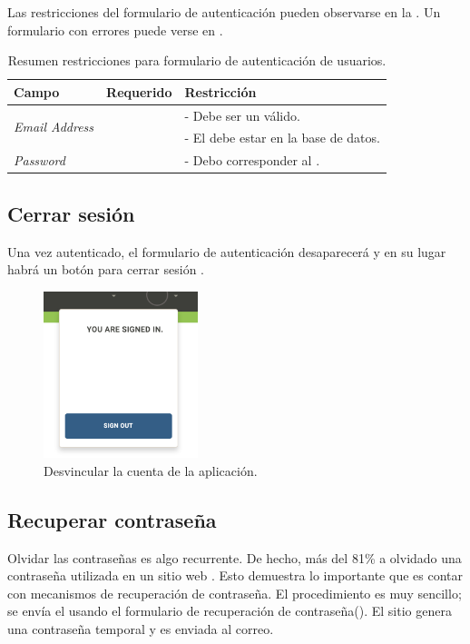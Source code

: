 Las restricciones del formulario de autenticación pueden observarse en la . Un formulario con errores puede verse en .

\begin{table}[H]
    \centering
	\begin{tabular}{ |l|c||l| }
		\hline Campo & Requerido & Restricción \\ \hline
		\multirow{2}{*}{\textit{Email Address}} &  \multirow{2}{*}{\checkmark}
				& - Debe ser un \email válido. \\ 
			& 	& - El \email debe estar en la base de datos. \\ \hline
		\multirow{1}{*}{\textit{Password}} 		&  \multirow{1}{*}{\checkmark} & - Debo corresponder al \email. \\ \hline
	\end{tabular}
 	\caption{Resumen restricciones para formulario de autenticación de usuarios.}
    \label{tab:architecture:accounts:signin:form}
\end{table}

\subsection{Cerrar sesión}

Una vez autenticado, el formulario de autenticación desaparecerá y en su lugar habrá un botón para cerrar sesión .

\begin{figure}[H]
	\centering
	\includegraphics[width=0.4\textwidth]{figuras/architecture/accounts/logout/ui.png}
	\caption{Desvincular la cuenta de la aplicación.}
	\label{figure:architecture:accounts:logout:ui}
\end{figure}

\subsection{Recuperar contraseña}
Olvidar las contraseñas es algo recurrente. De hecho, más del 81\% a olvidado una contraseña utilizada en un sitio web \cite{online_berkeley_behavior_toward_password}. Esto demuestra lo importante que es contar con mecanismos de recuperación de contraseña.
El procedimiento es muy sencillo; se envía el \email usando el formulario de recuperación de contraseña(). El sitio genera una contraseña temporal y es enviada al correo.

